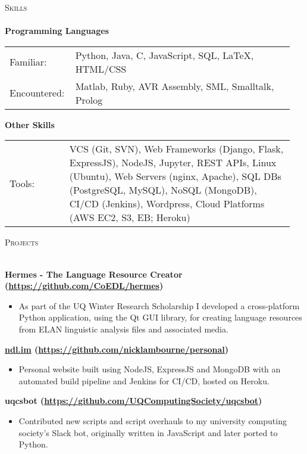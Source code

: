 \documentclass[a4paper]{article}
\newcommand{\lineunder} {
    \vspace*{-8pt} \\
    \hspace*{-10pt} \hrulefill \\
}
\newcommand{\header} [1] {
    {\hspace*{-10pt}\vspace*{6pt} \textsc{#1}}
    \vspace*{-6pt} \lineunder
}
\newenvironment{singleitem}
{   \small
    \vspace{-2.6pt}
    \begin{itemize}
    \setlength{\itemsep}{0pt}
    \setlength{\parskip}{0pt}
    \setlength{\parsep}{0pt}   }
{\end{itemize} \vspace{-2.6pt}	}
\begin{document}
\vspace{-1mm}
\header{Skills}
\textbf{Programming Languages}
\begin{tabular}{p{0.20\linewidth}p{0.75\linewidth}}
	\small Familiar: & \small Python, Java, C, JavaScript, SQL, \LaTeX, HTML/CSS \\
	\small Encountered: & \small Matlab, Ruby, AVR Assembly, SML, Smalltalk, Prolog\\
\end{tabular}
\textbf{Other Skills}
\begin{tabular}{p{0.20\linewidth}p{0.75\linewidth}}
	\small Tools: & \small VCS (Git, SVN), Web Frameworks (Django, Flask, ExpressJS), NodeJS,  Jupyter, REST APIs, Linux (Ubuntu), Web Servers (nginx, Apache), SQL DBs (PostgreSQL, MySQL), NoSQL (MongoDB), CI/CD (Jenkins), Wordpress, Cloud Platforms (AWS EC2, S3, EB; Heroku)
\end{tabular}

\vspace{1mm}

\header{Projects}
\vspace{1mm}

\textbf{{Hermes - The Language Resource Creator} (\href{https://github.com/CoEDL/hermes}{https://github.com/CoEDL/hermes})}
\begin{singleitem}
	\item As part of the UQ Winter Research Scholarship I developed a cross-platform Python application, using the Qt GUI library, for creating language resources from ELAN linguistic analysis files and associated media.
\end{singleitem}

\textbf{\href{https://ndl.im}{ndl.im} (\href{https://github.com/nicklambourne/personal}{https://github.com/nicklambourne/personal})}
\begin{singleitem}
	\item Personal website built using NodeJS, ExpressJS and MongoDB with an automated build pipeline and Jenkins for CI/CD, hosted on Heroku.
\end{singleitem}

\textbf{uqcsbot (\href{https://github.com/UQComputingSociety/uqcsbot}{https://github.com/UQComputingSociety/uqcsbot})}
\begin{singleitem}
	\item Contributed new scripts and script overhauls to my university computing society's Slack bot, originally written in JavaScript and later ported to Python.
\end{singleitem}
\end{document}
